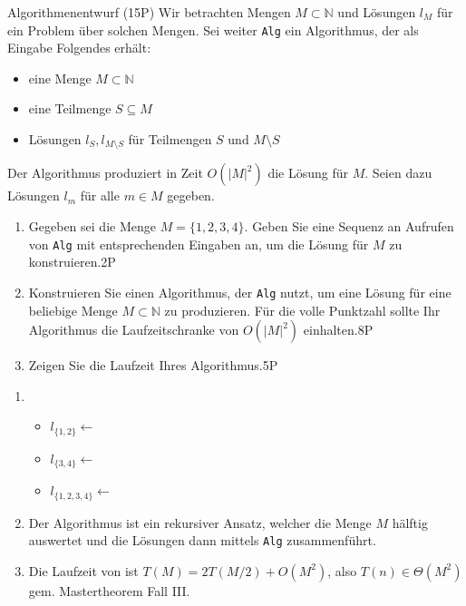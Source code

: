 \documentclass{article}
\begin{document}
\begin{exercise}{Algorithmenentwurf (15P)}
  Wir betrachten Mengen $M \subset \mathbb{N}$ und Lösungen $l_M$ für ein Problem über solchen Mengen. Sei weiter \texttt{Alg} ein Algorithmus, der als Eingabe Folgendes erhält:
  \begin{itemize}
    \item eine Menge $M \subset \mathbb{N}$
    \item eine Teilmenge $S \subseteq M$
    \item Lösungen $l_S, l_{M \setminus S}$ für Teilmengen $S$ und $M \setminus S$
  \end{itemize}
  Der Algorithmus produziert in Zeit $O(|M|^2)$ die Lösung für $M$. Seien dazu Lösungen $l_m$ für alle $m \in M$ gegeben.
  \begin{enumerate}
    \item Gegeben sei die Menge $M = \{1, 2, 3, 4\}$. Geben Sie eine Sequenz an Aufrufen von \texttt{Alg} mit entsprechenden Eingaben an, um die Lösung für $M$ zu konstruieren.\hfill 2P
    \item Konstruieren Sie einen Algorithmus, der \texttt{Alg} nutzt, um eine Lösung für eine beliebige Menge $M \subset \mathbb{N}$ zu produzieren. Für die volle Punktzahl sollte Ihr Algorithmus die Laufzeitschranke von $O(|M|^2)$ einhalten.\hfill 8P
    \item Zeigen Sie die Laufzeit Ihres Algorithmus.\hfill 5P
  \end{enumerate}
  \begin{solution}
    \begin{enumerate}
      \item \begin{itemize}
              \item $l_{\{1,2\}}\gets$
              \item $l_{\{3,4\}}\gets$
              \item $l_{\{1,2,3,4\}}\gets$
            \end{itemize}
      \item Der Algorithmus  ist ein rekursiver Ansatz, welcher die Menge $M$ hälftig auswertet und die Lösungen dann mittels \texttt{Alg} zusammenführt.\par
            
      \item Die Laufzeit von  ist $T(M)=2T(M/2)+O(M^2)$, also $T(n) \in \Theta(M^2)$ gem. Mastertheorem Fall III.
    \end{enumerate}
  \end{solution}
\end{exercise}
\end{document}
